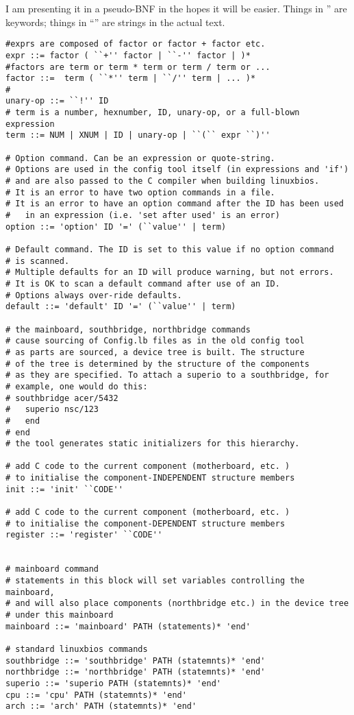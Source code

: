 I am presenting it in a pseudo-BNF in the hopes it will be easier. Things
in '' are keywords; things in ``'' are strings in the actual text.
\begin{verbatim}
#exprs are composed of factor or factor + factor etc.
expr ::= factor ( ``+'' factor | ``-'' factor | )*
#factors are term or term * term or term / term or ...
factor ::=  term ( ``*'' term | ``/'' term | ... )*
#
unary-op ::= ``!'' ID
# term is a number, hexnumber, ID, unary-op, or a full-blown expression
term ::= NUM | XNUM | ID | unary-op | ``(`` expr ``)''

# Option command. Can be an expression or quote-string.
# Options are used in the config tool itself (in expressions and 'if')
# and are also passed to the C compiler when building linuxbios.
# It is an error to have two option commands in a file.
# It is an error to have an option command after the ID has been used
#   in an expression (i.e. 'set after used' is an error)
option ::= 'option' ID '=' (``value'' | term)

# Default command. The ID is set to this value if no option command
# is scanned.
# Multiple defaults for an ID will produce warning, but not errors.
# It is OK to scan a default command after use of an ID.
# Options always over-ride defaults.
default ::= 'default' ID '=' (``value'' | term)

# the mainboard, southbridge, northbridge commands
# cause sourcing of Config.lb files as in the old config tool
# as parts are sourced, a device tree is built. The structure
# of the tree is determined by the structure of the components
# as they are specified. To attach a superio to a southbridge, for
# example, one would do this:
# southbridge acer/5432
#   superio nsc/123
#   end
# end
# the tool generates static initializers for this hierarchy.

# add C code to the current component (motherboard, etc. )
# to initialise the component-INDEPENDENT structure members
init ::= 'init' ``CODE''

# add C code to the current component (motherboard, etc. )
# to initialise the component-DEPENDENT structure members
register ::= 'register' ``CODE''


# mainboard command
# statements in this block will set variables controlling the mainboard,
# and will also place components (northbridge etc.) in the device tree
# under this mainboard
mainboard ::= 'mainboard' PATH (statements)* 'end'

# standard linuxbios commands
southbridge ::= 'southbridge' PATH (statemnts)* 'end'
northbridge ::= 'northbridge' PATH (statemnts)* 'end'
superio ::= 'superio PATH (statemnts)* 'end'
cpu ::= 'cpu' PATH (statemnts)* 'end'
arch ::= 'arch' PATH (statemnts)* 'end'


\end{verbatim}
